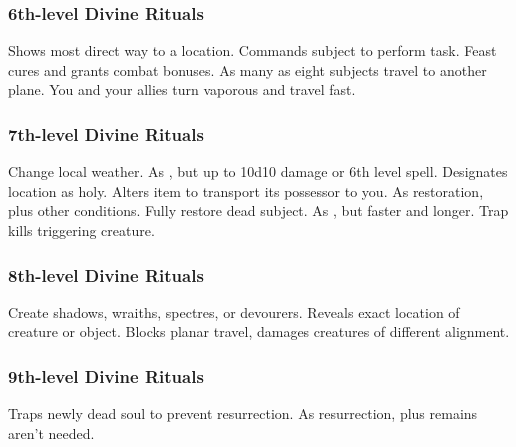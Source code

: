 \subsubsection{6th-level Divine Rituals}
\begin{rituallist}
     Shows most direct way to a location.
     Commands subject to perform task.
     Feast cures and grants combat bonuses.
    \F As many as eight subjects travel to another plane.
     You and your allies turn vaporous and travel fast.
\end{rituallist}

\subsubsection{7th-level Divine Rituals}
\begin{rituallist}
     Change local weather.
     As , but up to 10d10 damage or 6th level spell.
     Designates location as holy.
     Alters item to transport its possessor to you.
     As restoration, plus other conditions.
     Fully restore dead subject.
     As , but faster and longer.
     Trap kills triggering creature.
\end{rituallist}

\subsubsection{8th-level Divine Rituals}
\begin{rituallist}
     Create shadows, wraiths, spectres, or devourers.
     Reveals exact location of creature or object.
     Blocks planar travel, damages creatures of different alignment.
\end{rituallist}

\subsubsection{9th-level Divine Rituals}
\begin{rituallist}
    \F Traps newly dead soul to prevent resurrection.
     As resurrection, plus remains aren't needed.
\end{rituallist}

